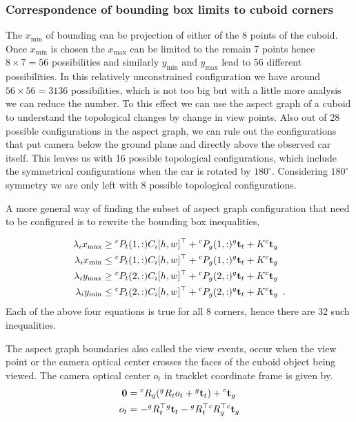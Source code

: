 \documentclass[10pt,twocolumn,letterpaper]{article}
\newcommand{\xymin}[1]{#1_{\text{min}}}
\newcommand{\xymax}[1]{#1_{\text{max}}}
\newcommand{\xmin}{\xymin{x}}
\newcommand{\xmax}{\xymax{x}}
\newcommand{\ymin}{\xymin{y}}
\newcommand{\ymax}{\xymax{y}}
\begin{document}
\subsubsection{Correspondence of bounding box limits to cuboid corners}
The $\xmin$ of bounding can be projection of either of the 8 points of the
cuboid. Once $\xmin$ is chosen the $\xmax$ can be limited to the remain 7
points hence $8 \times 7= 56$ possibilities and similarly $\ymin$ and $\ymax$
lead to 56 different possibilities. In this relatively unconstrained
configuration we have around $56 \times 56 = 3136$ possibilities, which is not
too big but with a little more analysis we can reduce the number. To this
effect we can use the aspect graph of a cuboid to understand the topological
changes by change in view points. Also out of 28 possible configurations in the
aspect graph, we can rule out the configurations that put camera below the
ground plane and directly above the observed car itself. This leaves us with 16
possible topological configurations, which include the symmetrical
configurations when the car is rotated by $180^\circ$. Considering $180^\circ$ symmetry we are only left with 8 possible topological configurations.

A more general way of finding the subset of aspect graph configuration that
need to be configured is to rewrite the bounding box inequalities, 

\begin{align}
  \lambda_i \xmax &\ge \Ptc(1, :) C_i [h, w]^\top + \Pgc(1, :) \ttg + K \tgc\\
  \label{eq:bbox-ineqst}
  \lambda_i \xmin &\le \Ptc(1, :) C_i [h, w]^\top + \Pgc(1, :) \ttg + K \tgc\\
  \lambda_i \ymax &\ge \Ptc(2, :) C_i [h, w]^\top + \Pgc(2, :) \ttg + K \tgc\\
  \lambda_i \ymin &\le \Ptc(2, :) C_i [h, w]^\top + \Pgc(2, :) \ttg + K \tgc \enspace.
  \label{eq:bbox-ineq}
\end{align}
Each of the above four equations is true for all 8 corners, hence there are 32 such inequalities.

The aspect graph boundaries also called the view events, occur when the view
point or the camera optical center crosses the faces of the cuboid object being
viewed. The camera optical center $o_t$ in tracklet coordinate frame is given by.
\begin{align}
  \mathbf{0} &= {}^{c}{R}_{g}({}^{g}{R}_{t} o_t + {}^{g}{\mathbf{t}}_{t}) + {}^{c}{\mathbf{t}}_{g}\\
  o_t &= -{}^{g}{R}_{t}^\top {}^{g}{\mathbf{t}}_{t} -{}^{g}{R}_{t}^\top {}^{c}{R}_{g}^\top {}^{c}{\mathbf{t}}_{g}
\end{align}
\end{document}
